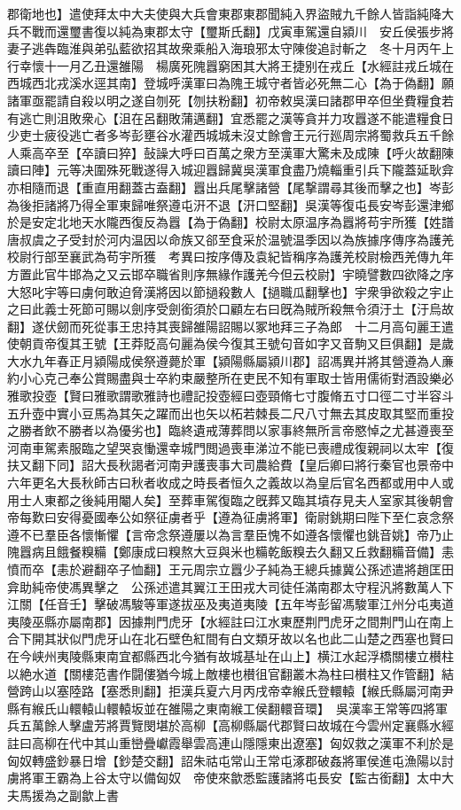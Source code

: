 郡衛地也】遣使拜太中大夫使與大兵會東郡東郡聞純入界盜賊九千餘人皆詣純降大兵不戰而還璽書復以純為東郡太守【璽斯氏翻】戊寅車駕還自潁川　安丘侯張步將妻子逃犇臨淮與弟弘藍欲招其故衆乘船入海琅邪太守陳俊追討斬之　冬十月丙午上行幸懷十一月乙丑還雒陽　楊廣死隗囂窮困其大將王捷别在戎丘【水經註戎丘城在西城西北戎溪水逕其南】登城呼漢軍曰為隗王城守者皆必死無二心【為于偽翻】願諸軍亟罷請自殺以明之遂自刎死【刎扶粉翻】初帝敕吳漢曰諸郡甲卒但坐費糧食若有逃亡則沮敗衆心【沮在呂翻敗蒲邁翻】宜悉罷之漢等貪并力攻囂遂不能遣糧食日少吏士疲役逃亡者多岑彭壅谷水灌西城城未沒丈餘會王元行廵周宗將蜀救兵五千餘人乘高卒至【卒讀曰猝】鼔譟大呼曰百萬之衆方至漢軍大驚未及成陳【呼火故翻陳讀曰陣】元等决圍殊死戰遂得入城迎囂歸冀吳漢軍食盡乃燒輜重引兵下隴蓋延耿弇亦相隨而退【重直用翻蓋古盍翻】囂出兵尾擊諸營【尾撃謂尋其後而擊之也】岑彭為後拒諸將乃得全軍東歸唯祭遵屯汧不退【汧口堅翻】吳漢等復屯長安岑彭還津鄉於是安定北地天水隴西復反為囂【為于偽翻】校尉太原温序為囂將苟宇所獲【姓譜唐叔虞之子受封於河内温因以命族又郤至食采於温號温季因以為族據序傳序為護羌校尉行部至襄武為苟宇所獲　考異曰按序傳及袁紀皆稱序為護羌校尉檢西羌傳九年方置此官牛邯為之又云邯卒職省則序無緣作護羌今但云校尉】宇曉譬數四欲降之序大怒叱宇等曰虜何敢迫脅漢將因以節撾殺數人【撾職瓜翻擊也】宇衆爭欲殺之宇止之曰此義士死節可賜以劍序受劍銜須於口顧左右曰旣為賊所殺無令須汙土【汙烏故翻】遂伏劒而死從事王忠持其喪歸雒陽詔賜以冢地拜三子為郎　十二月高句麗王遣使朝貢帝復其王號【王莽貶高句麗為侯今復其王號句音如字又音駒又巨俱翻】是歲大水九年春正月潁陽成侯祭遵薨於軍【潁陽縣屬潁川郡】詔馮異并將其營遵為人亷約小心克己奉公賞賜盡與士卒約束嚴整所在吏民不知有軍取士皆用儒術對酒設樂必雅歌投壺【賢曰雅歌謂歌雅詩也禮記投壺經曰壺頸脩七寸腹脩五寸口徑二寸半容斗五升壺中實小豆馬為其矢之躍而出也矢以柘若棘長二尺八寸無去其皮取其堅而重投之勝者飲不勝者以為優劣也】臨終遺戒薄葬問以家事終無所言帝愍悼之尤甚遵喪至河南車駕素服臨之望哭哀慟還幸城門閲過喪車涕泣不能已喪禮成復親祠以太牢【復扶又翻下同】詔大長秋謁者河南尹護喪事大司農給費【皇后卿曰將行秦官也景帝中六年更名大長秋師古曰秋者收成之時長者恒久之義故以為皇后官名西都或用中人或用士人東都之後純用閹人矣】至葬車駕復臨之旣葬又臨其墳存見夫人室家其後朝會帝每歎曰安得憂國奉公如祭征虜者乎【遵為征虜將軍】衛尉銚期曰陛下至仁哀念祭遵不已羣臣各懷慚懼【言帝念祭遵屢以為言羣臣愧不如遵各懷懼也銚音姚】帝乃止　隗囂病且餓餐糗糒【鄭康成曰糗熬大豆與米也糒乾飯糗去久翻又丘救翻糒音備】恚憤而卒【恚於避翻卒子恤翻】王元周宗立囂少子純為王總兵據冀公孫述遣將趙匡田弇助純帝使馮異擊之　公孫述遣其翼江王田戎大司徒任滿南郡太守程汎將數萬人下江關【任音壬】擊破馮駿等軍遂拔巫及夷道夷陵【五年岑彭留馮駿軍江州分屯夷道夷陵巫縣亦屬南郡】因據荆門虎牙【水經註曰江水東歷荆門虎牙之間荆門山在南上合下開其狀似門虎牙山在北石壁色紅間有白文類牙故以名也此二山楚之西塞也賢曰在今峡州夷陵縣東南宜都縣西北今猶有故城基址在山上】横江水起浮橋關樓立櫕柱以絶水道【關樓范書作闘僂猶今城上敵樓也櫕徂官翻叢木為柱曰櫕柱又作管翻】結營跨山以塞陸路【塞悉則翻】拒漢兵夏六月丙戌帝幸緱氏登轘轅【緱氏縣屬河南尹縣有緱氏山轘轅山轘轅坂並在雒陽之東南緱工侯翻轘音環】　吳漢率王常等四將軍兵五萬餘人擊盧芳將賈覽閔堪於高柳【高柳縣屬代郡賢曰故城在今雲州定襄縣水經註曰高柳在代中其山重巒疊巘霞舉雲高連山隱隱東出遼塞】匈奴救之漢軍不利於是匈奴轉盛鈔暴日增【鈔楚交翻】詔朱祜屯常山王常屯涿郡破姦將軍侯進屯漁陽以討虜將軍王霸為上谷太守以備匈奴　帝使來歙悉監護諸將屯長安【監古銜翻】太中大夫馬援為之副歙上書